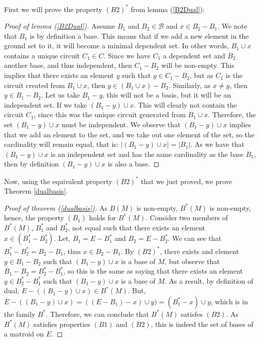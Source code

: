 First we will prove the property $(B2)^*$ from lemma (\ref{B2Dual}):
\begin{proof}[Proof of lemma (\ref{B2Dual})]
Assume $B_1$ and $B_2 \in \mathcal{B}$ and $x \in B_2 - B_1$.
  We note that $B_1$ is by definition a base. This means that if we add a new element in the ground set to it, it will become a minimal dependent set. In other words, $B_1 \cup x$ contains a unique circuit $C_1 \in C$. Since we have $C_1$ a dependent set and $B_2$ another base, and thus independent, then $C_1 - B_2$ will be non-empty. This implies that there exists an element $y$ such that $y \in C_1 - B_2$, but as $C_1$ is the circuit created from $B_1 \cup x$, then $y \in (B_1 \cup x) - B_2$. Similarly, as $x \neq y$, then $y \in B_1 - B_2$. Let us take $B_1 - y$, this will not be a basis, but it will be an independent set. If we take $(B_1 - y)\cup x$. This will clearly not contain the circuit $C_1$, since this was the unique circuit generated from $B_1 \cup x$. Therefore, the set $(B_1 - y)\cup x$ must be independent. We observe that $(B_1 - y)\cup x$ implies that we add an element to the set, and we take out one element of the set, so the cardinality will remain equal, that is: $|(B_1 - y)\cup x|=|B_1|$.
As we have that $(B_1 - y)\cup x$ is an independent set and has the same cardinality as the base $B_1$, then by definition $(B_1 - y)\cup x$ is also a base. 
\end{proof}

Now, using the equivalent property $(B2)^*$ that we just proved, we prove Theorem \ref{dualbasis}.
\begin{proof}[Proof of theorem (\ref{dualbasis})]
    As $B(M)$ is non-empty, $B^*(M)$ is non-empty, hence, the property $(B_1)$ holds for $B^*(M)$. 
    Consider two members of $B^*(M)$, $B^*_1$ and $B^*_2$, not equal such that there exists an element $x \in (B^*_1 - B^*_2)$. Let, $B_1 = E - B^*_1$ and $B_2 = E - B^*_2$. We can see that $B^*_1 - B^*_2 = B_2 - B_1$, thus $x \in B_2 - B_1$. By $(B2)^*$, there exists and element $y \in  B_1 - B_2$ such that $(B_1 - y)\cup x$ is a base of $M$, but observe that $B_1 - B_2 = B^*_2 - B^*_1$, so this is the same as saying that there exists an element $y \in  B^*_2 - B^*_1$ such that $(B_1 - y)\cup x$ is a base of $M$. As a result, by definition of dual, $E-((B_1 - y)\cup x) \in B^*(M)$. But, $E-((B_1 - y)\cup x) = ((E-B_1)-x)\cup y) = (B_1^* - x)\cup y$, which is in the family $B^*$. Therefore, we can conclude that $B^*(M)$ satisfes $(B2)$. As $B^*(M)$ satisfies  properties $(B1)$ and $(B2)$, this is indeed the set of bases of a matroid on $E$.
\end{proof}

